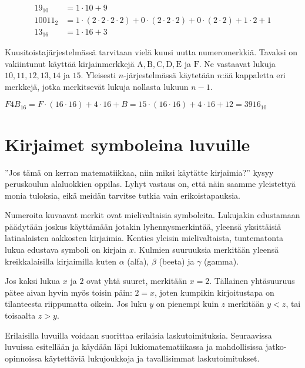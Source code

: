 \begin{esimerkki}
\begin{align*}
19_{10} &= 1 \cdot 10 + 9 \\
10011_{2} &= 1 \cdot (2 \cdot 2 \cdot 2 \cdot 2) + 0 \cdot (2 \cdot 2 \cdot 2) + 0 \cdot (2 \cdot 2) + 1 \cdot 2 + 1 \\
13_{16} &= 1 \cdot 16 + 3
\end{align*}
\end{esimerkki}

Kuusitoistajärjestelmässä tarvitaan vielä kuusi uutta numeromerkkiä. Tavaksi on vakiintunut käyttää kirjainmerkkejä $\mathrm{A, B, C, D, E}$ ja $\mathrm{F}$. Ne vastaavat lukuja $10, 11, 12, 13, 14$ ja $15$. Yleisesti $n$-järjestelmässä käytetään $n$:ää kappaletta eri merkkejä, jotka merkitsevät lukuja nollasta lukuun $n-1$.

\begin{esimerkki}
$F4B_{16} = F \cdot (16 \cdot 16) + 4 \cdot 16 + B = 15 \cdot (16 \cdot 16) + 4 \cdot 16 + 12 = 3916_{10}$
\end{esimerkki}


\section{Kirjaimet symboleina luvuille}

''Jos tämä on kerran matematiikkaa, niin miksi käytätte kirjaimia?'' kysyy peruskoulun alaluokkien oppilas. Lyhyt vastaus on, että näin saamme yleistettyä monia tuloksia, eikä meidän tarvitse tutkia vain erikoistapauksia.

Numeroita kuvaavat merkit ovat mielivaltaisia symboleita. Lukujakin edustamaan päädytään joskus käyttämään jotakin lyhennysmerkintää, yleensä yksittäisiä latinalaisten aakkosten kirjaimia. Kenties yleisin mielivaltaista, tuntematonta lukua edustava symboli on kirjain $x$. Kulmien suuruuksia merkitään yleensä kreikkalaisilla kirjaimilla kuten $\alpha$ (alfa), $\beta$ (beeta) ja $\gamma$ (gamma).

Jos kaksi lukua $x$ ja $2$ ovat yhtä suuret, merkitään
$x=2$. Tällainen yhtäsuuruus pätee aivan hyvin myös toisin päin: $2=x$, joten kumpikin kirjoitustapa on tilanteesta riippumatta oikein. Jos luku $y$ on pienempi kuin $z$ merkitään $y<z$, tai toisaalta $z>y$.


Erilaisilla luvuilla voidaan suorittaa erilaisia laskutoimituksia. Seuraavissa luvuissa esitellään ja käydään läpi lukiomatematiikassa ja mahdollisissa jatko-opinnoissa käytettäviä lukujoukkoja ja tavallisimmat laskutoimitukset.
